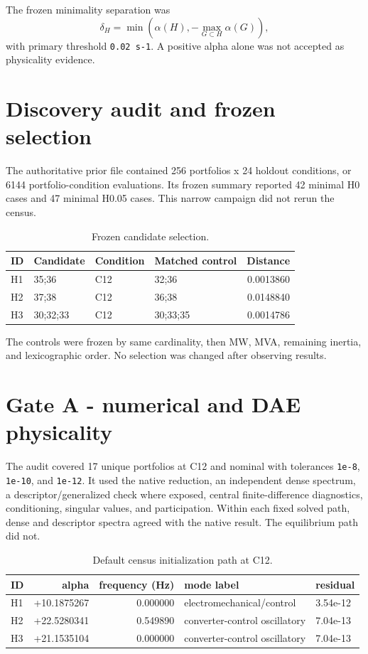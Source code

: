 \documentclass[10pt]{article}
\newcommand{\code}[1]{\texttt{#1}}
\begin{document}
The frozen minimality separation was
\[
 \delta_H = \min\left(\alpha(H), -\max_{G\subset H}\alpha(G)\right),
\]
with primary threshold \code{0.02 s-1}. A positive alpha alone was not
accepted as physicality evidence.

\section{Discovery audit and frozen selection}

The authoritative prior file contained 256 portfolios x 24 holdout conditions,
or 6144 portfolio-condition evaluations. Its frozen summary reported 42
minimal H0 cases and 47 minimal H0.05 cases. This narrow campaign did not
rerun the census.

\begin{table}[h]
\centering
\caption{Frozen candidate selection.}
\begin{tabular}{llllr}
\toprule
ID & Candidate & Condition & Matched control & Distance\\
\midrule
H1 & 35;36 & C12 & 32;36 & 0.0013860\\
H2 & 37;38 & C12 & 36;38 & 0.0148840\\
H3 & 30;32;33 & C12 & 30;33;35 & 0.0014786\\
\bottomrule
\end{tabular}
\end{table}

The controls were frozen by same cardinality, then MW, MVA, remaining
inertia, and lexicographic order. No selection was changed after observing
results.

\section{Gate A - numerical and DAE physicality}

The audit covered 17 unique portfolios at C12 and nominal with tolerances
\code{1e-8}, \code{1e-10}, and \code{1e-12}. It used the native reduction,
an independent dense spectrum, a descriptor/generalized check where exposed,
central finite-difference diagnostics, conditioning, singular values, and
participation. Within each fixed solved path, dense and descriptor spectra
agreed with the native result. The equilibrium path did not.

\begin{table}[h]
\centering
\caption{Default census initialization path at C12.}
\begin{tabular}{lrrll}
\toprule
ID & alpha & frequency (Hz) & mode label & residual\\
\midrule
H1 & +10.1875267 & 0.000000 & electromechanical/control & 3.54e-12\\
H2 & +22.5280341 & 0.549890 & converter-control oscillatory & 7.04e-13\\
H3 & +21.1535104 & 0.000000 & converter-control oscillatory & 7.04e-13\\
\bottomrule
\end{tabular}
\end{table}
\end{document}
